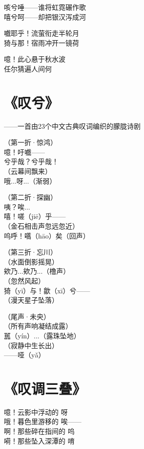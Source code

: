 咳兮唾——谁将虹霓碾作歌 \\
嘻兮呵——却把银汉泻成河
\vspace{1em}

嚱耶乎！流萤衔走半轮月 \\
猗与那！宿雨冲开一镜荷
\vspace{1em}

噫！此心悬于秋水波 \\
任尔猜遍人间何

\clearpage


\section{《叹兮》}

——一首由23个中文古典叹词编织的朦胧诗剧
\vspace{1em}

（第一折·惊鸿） \\
噫！吁嚱—— \\
兮乎哉？兮乎哉！ \\
（云幕间飘来） \\
哦...呀...（渐弱）
\vspace{1em}

（第二折·探幽） \\
咦？唉... \\
嘻！嗟（jiē）乎—— \\
（金石相击声忽远忽近） \\
呜呼！嚆（hāo）矣（回声）
\vspace{1em}

（第三折·忘川） \\
（水面倒影摇晃） \\
欸乃...欸乃...（橹声） \\
（忽然风起） \\
猗（yī）与！歙（xī）兮—— \\
（漫天星子坠落）
\vspace{1em}

（尾声·未央） \\
（所有声响凝结成露） \\
嚚（yín）...（露珠坠地） \\
（寂静中生长出） \\
——哑（yǎ）

\clearpage


\section{《叹调三叠》}

噫！云影中浮动的 呀 \\
哦！暮色里游移的 唉—— \\
啊！那些碎在指间的 呜 \\
嗬！那些坠入深潭的 唷
\vspace{1em}

